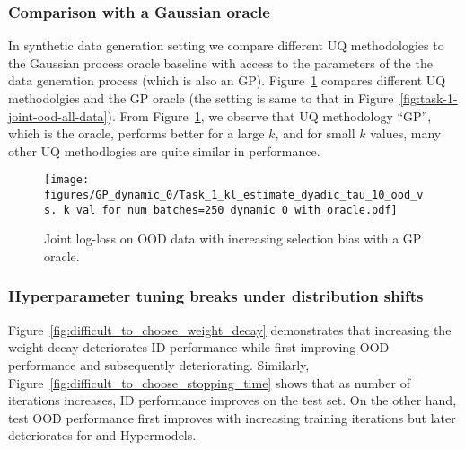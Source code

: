 
\subsubsection{Comparison with a Gaussian oracle}
In synthetic data generation setting we compare different UQ methodologies to the  Gaussian process oracle baseline with access to the parameters of the the data generation process (which is also an GP).  Figure~\ref{fig:task-1-joint-ood-all-data-with-oracle} compares  different UQ methodolgies and the GP oracle (the setting is same to that in Figure~\ref{fig:task-1-joint-ood-all-data}).
From Figure~\ref{fig:task-1-joint-ood-all-data-with-oracle}, we observe that UQ methodology ``GP'', which is the oracle, performs better for a large $k$, and for small $k$ values, many other UQ methodlogies are quite similar in performance. 

\begin{figure}
\centering 
\centering \texttt{[image: figures/GP\_dynamic\_0/Task\_1\_kl\_estimate\_dyadic\_tau\_10\_ood\_vs.\_k\_val\_for\_num\_batches=250\_dynamic\_0\_with\_oracle.pdf]}

\caption{Joint log-loss on OOD data with increasing selection bias with a GP oracle.}
\label{fig:task-1-joint-ood-all-data-with-oracle}
\end{figure}


\subsubsection{Hyperparameter tuning breaks under distribution shifts}

\label{sec:hyperparameter_tuning_breaks_under_dis_shifts_experiment_simple}

Figure~\ref{fig:difficult_to_choose_weight_decay} demonstrates that increasing the weight decay deteriorates ID performance while first improving OOD performance and subsequently deteriorating.  
Similarly, Figure~\ref{fig:difficult_to_choose_stopping_time} shows that as number of iterations increases, ID performance improves on the test set.  On the other hand, test OOD performance first improves with increasing training iterations but later deteriorates for \ensembleplus and Hypermodels.




